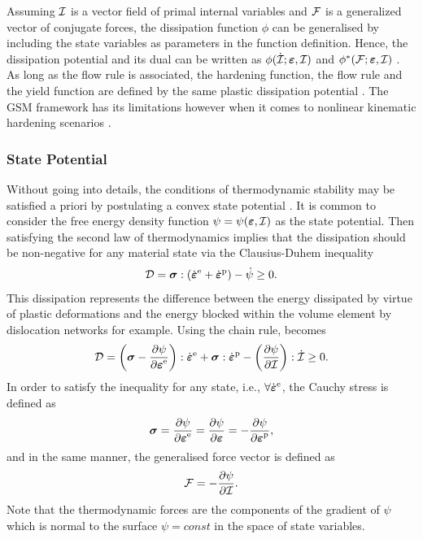 Assuming ${\cal I}$ is a vector field of primal internal variables and ${\cal F}$ is a generalized vector of conjugate
forces, the dissipation function $\phi$ can be generalised by including the state variables as parameters in the function definition. Hence, the dissipation potential and its dual can be written as $\phi(\dot{{\cal I}};\mbox{$\bm \varepsilon $},{\cal I})$ and $\phi^\ast({\cal F};\mbox{$\bm \varepsilon $},{\cal I})$ \parencite{lemaitre1994mechanics}. As long as the flow rule is associated, the hardening function, the flow rule and the yield function are defined by the same plastic dissipation potential \parencite{besson2009non}. The GSM framework has its limitations however when it comes to nonlinear kinematic hardening scenarios \parencite{leuschner2015potential}.

\subsubsection{State Potential}

Without going into details, the conditions of thermodynamic stability may be satisfied a priori by postulating a convex state potential \parencite{lemaitre1994mechanics}. It is common to consider the free energy density function $\psi=\psi(\mbox{$\bm \varepsilon $},{\cal I})$ as the state potential. Then satisfying the second law of thermodynamics implies that the dissipation should be non-negative for any material state via the Clausius-Duhem inequality \parencite{lemaitre1994mechanics}
\begin{equation}
	\begin{split}
		{\cal D} =\mbox{$\bm \sigma$} : ({\dot{\mbox{$\bm \varepsilon $}}}^{\rm e} + {\dot{\mbox{$\bm \varepsilon $}}}^{\rm p}) - \dot{\psi} \geq 0.
	\end{split}
	\label{eq:CDinequality}
\end{equation}
This dissipation represents the difference between the energy dissipated by virtue of plastic deformations and the energy blocked within the volume element by dislocation networks for example. Using the chain rule,  becomes
\begin{equation}
	{\cal D}= \left( \mbox{$\bm \sigma$} - \displaystyle\frac{\displaystyle\partial \psi}{\displaystyle\partial \mbox{$\bm \varepsilon $}^{\rm{e}}} \right) : {\dot{\mbox{$\bm \varepsilon $}}}^{\rm e} + \mbox{$\bm \sigma$} : {\dot{\mbox{$\bm \varepsilon $}}}^{\rm p} - \left( \displaystyle\frac{\displaystyle\partial \psi}{\displaystyle\partial {\cal I}} \right) : \dot{{\cal I}} \geq 0.
	\label{eq:cd}
\end{equation}
In order to satisfy the inequality for any state, i.e., $\forall {\dot{\mbox{$\bm \varepsilon $}}}^{\rm e}$, the Cauchy stress is defined as
\begin{equation}
	\mbox{$\bm \sigma$} = \displaystyle\frac{\displaystyle\partial \psi}{\displaystyle\partial \mbox{$\bm \varepsilon $}^{\rm{e}}} = \displaystyle\frac{\displaystyle\partial \psi}{\displaystyle\partial \mbox{$\bm \varepsilon $}} = - \displaystyle\frac{\displaystyle\partial \psi}{\displaystyle\partial \mbox{$\bm \varepsilon $}^{\rm{p}}},
	\label{eq_stress_state}
\end{equation}
and in the same manner, the generalised force vector is defined as
\begin{equation}
	{\cal F} = -\displaystyle\frac{\displaystyle\partial \psi}{\displaystyle\partial {\cal I}}.
	\label{eq_hardening_state}
\end{equation}
Note that the thermodynamic forces are the components of the gradient of $\psi$ which is normal to the surface $\psi=const$ in the space of state variables.

